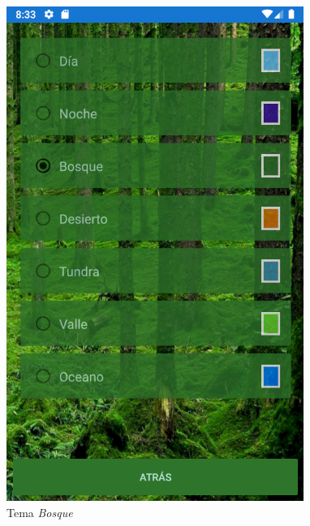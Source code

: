 \begin{figure}[H]
    \centering
    \includegraphics[scale=0.7]{Figures/Capturas/TemaBosque.png}
    \caption{Tema \textit{Bosque}}
    \label{Bosque}    
\end{figure}
